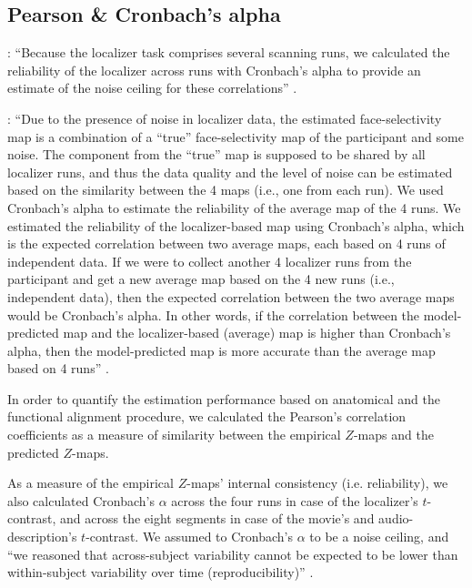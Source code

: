 \subsection{Pearson \& Cronbach's alpha}


\citet{jiahui2022cross}: ``Because the localizer task comprises several scanning
runs, we calculated the reliability of the localizer across runs with Cronbach's
alpha to provide an estimate of the noise ceiling for these correlations''
\citep{jiahui2022cross}.

%
\citep{feilong2022individualized}: ``Due to the presence of noise in localizer
data, the estimated face-selectivity map is a combination of a “true”
face-selectivity map of the participant and some noise.
%
The component from the “true” map is supposed to be shared by all localizer
runs, and thus the data quality and the level of noise can be estimated based on
the similarity between the 4 maps (i.e., one from each run).
%
We used Cronbach's alpha to estimate the reliability  of the average map of the
4 runs.
%
We estimated the reliability of the localizer-based map using Cronbach's alpha,
which is the expected correlation between two average maps, each based on 4 runs
of independent data.
%
If we were to collect another 4 localizer runs from the participant and get a
new average map based on the 4 new runs (i.e., independent data), then the
expected correlation between the two average maps would be Cronbach's alpha.
%
In other words, if the correlation between the model-predicted map and the
localizer-based (average) map is higher than Cronbach's alpha, then the
model-predicted map is more accurate than the average map based on 4 runs''
\citep{feilong2022individualized}.

In order to quantify the estimation performance based on anatomical and the
functional alignment procedure, we calculated the Pearson's correlation
coefficients as a measure of similarity between the empirical $Z$-maps and the
predicted $Z$-maps.

As a measure of the empirical $Z$-maps' internal consistency (i.e.
reliability), we also calculated Cronbach's $\alpha$ across the four runs in
case of the localizer's $t$-contrast, and across the eight segments in case of
the movie's and audio-description's $t$-contrast.
%
We assumed to Cronbach's $\alpha$ to be a noise ceiling, and ``we reasoned that
across-subject variability cannot be expected to be lower than within-subject
variability over time (reproducibility)'' \citep{rosenke2021probabilistic}.

